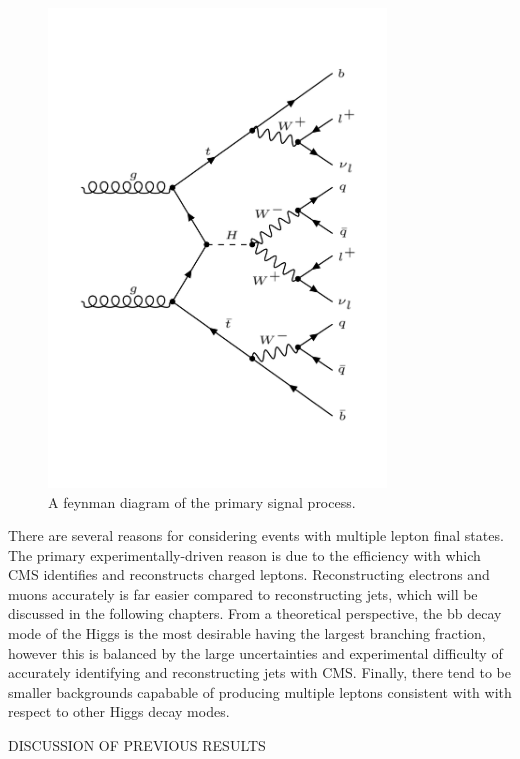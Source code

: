 \begin{figure}[hbtp]
 \begin{center}
   \includegraphics[width=0.8\textwidth]{ch1_figs/feynman_diagram_ttH_HWW_2lss.pdf}
   \caption{A feynman diagram of the primary signal process.}
   \label{fig:intro_feyn}
 \end{center}
\end{figure}

There are several reasons for considering \tth events with multiple lepton final states. The primary experimentally-driven reason is due to the efficiency with which
CMS identifies and reconstructs charged leptons. Reconstructing electrons and muons accurately is far easier compared to reconstructing jets,
which will be discussed in the following chapters. 
From a theoretical perspective, the bb decay mode of the Higgs is the most desirable having the largest branching fraction, however this is balanced by the large
uncertainties and experimental difficulty of accurately identifying and reconstructing jets with CMS.
Finally, there tend to be smaller backgrounds capabable of producing multiple leptons consistent with \tth with respect to other Higgs decay modes. 



DISCUSSION OF PREVIOUS \tth RESULTS

%
% 
% 
